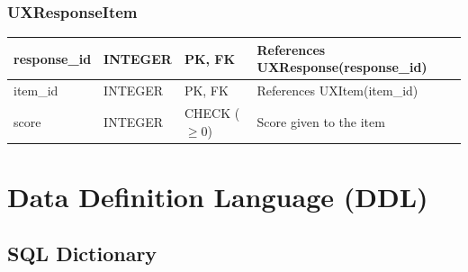 \documentclass[11pt]{article}
\begin{document}
\subsubsection*{UXResponseItem}
\begin{tabularx}{\linewidth}{|l|l|l|X|}
\hline
response\_id & INTEGER & PK, FK & References UXResponse(response\_id) \\
\hline
item\_id & INTEGER & PK, FK & References UXItem(item\_id) \\
\hline
score & INTEGER & CHECK ($\geq 0$) & Score given to the item \\
\hline
\end{tabularx}



\clearpage
\section{Data Definition Language (DDL)}

\subsection{SQL Dictionary}
\end{document}
